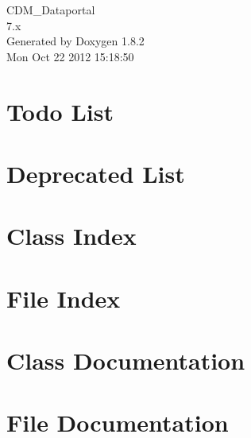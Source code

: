 \documentclass{book}
\begin{document}
\hypersetup{pageanchor=false,citecolor=blue}
\begin{titlepage}
\vspace*{7cm}
\begin{center}
{\Large C\-D\-M\-\_\-\-Dataportal \\[1ex]\large 7.\-x }\\
\vspace*{1cm}
{\large Generated by Doxygen 1.8.2}\\
\vspace*{0.5cm}
{\small Mon Oct 22 2012 15:18:50}\\
\end{center}
\end{titlepage}
\clearemptydoublepage
{}
\tableofcontents
\clearemptydoublepage
{}
\hypersetup{pageanchor=true,citecolor=blue}
\chapter{Todo List}
\label{todo}
\hypertarget{todo}{}

\chapter{Deprecated List}
\label{deprecated}
\hypertarget{deprecated}{}

\chapter{Class Index}

\chapter{File Index}

\chapter{Class Documentation}





\chapter{File Documentation}































\printindex
\end{document}
